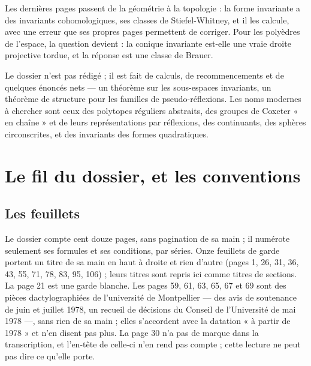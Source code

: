 \documentclass[11pt,a4paper]{article}
\begin{document}
\begin{resume}
Les dernières pages passent de la géométrie à la topologie : la forme
invariante a des invariants cohomologiques, ses classes de Stiefel-Whitney, et
il les calcule, avec une erreur que ses propres pages permettent de corriger.
Pour les polyèdres de l'espace, la question devient : la conique invariante
est-elle une vraie droite projective tordue, et la réponse est une classe de
Brauer.

Le dossier n'est pas rédigé ; il est fait de calculs, de recommencements et
de quelques énoncés nets --- un théorème sur les sous-espaces invariants, un
théorème de structure pour les familles de pseudo-réflexions. Les noms
modernes à chercher sont ceux des polytopes réguliers abstraits, des groupes de
Coxeter « en chaîne » et de leurs représentations par réflexions, des
continuants, des sphères circonscrites, et des invariants des formes
quadratiques.

\end{resume}

\section*{Le fil du dossier, et les conventions}

\subsection*{Les feuillets}

Le dossier compte cent douze pages, sans pagination de sa main ; il numérote
seulement ses formules et ses conditions, par séries. Onze feuillets de garde
portent un titre de sa main en haut à droite et rien d'autre (pages 1, 26, 31,
36, 43, 55, 71, 78, 83, 95, 106) ; leurs titres sont repris ici comme titres de
sections. La page 21 est une garde blanche. Les pages 59, 61, 63, 65, 67 et 69
sont des pièces dactylographiées de l'université de Montpellier --- des avis de
soutenance de juin et juillet 1978, un recueil de décisions du Conseil de
l'Université de mai 1978 ---, sans rien de sa main ; elles s'accordent avec la
datation « à partir de 1978 » et n'en disent pas plus. La page 30 n'a pas de
marque dans la transcription, et l'en-tête de celle-ci n'en rend pas compte ;
cette lecture ne peut pas dire ce qu'elle porte.
\end{document}
